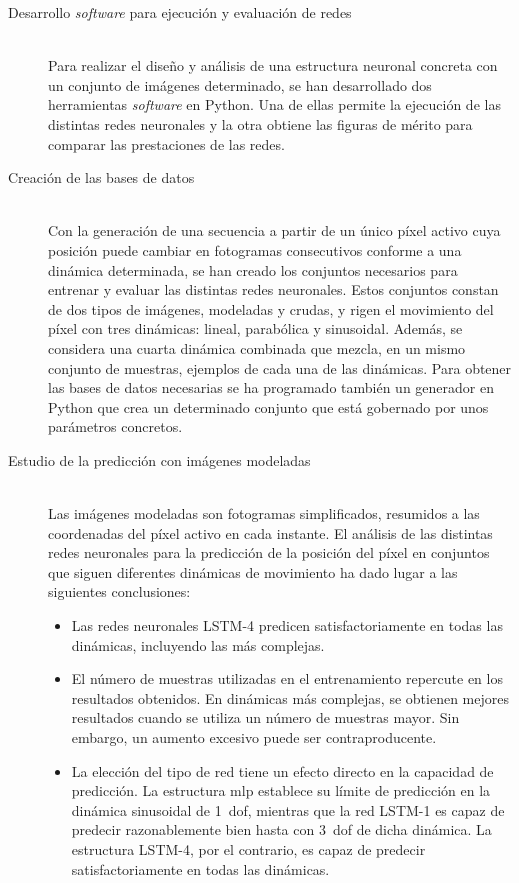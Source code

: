 \begin{description}
	\item[Desarrollo \textit{software} para ejecución y evaluación de redes] 
	\hfill 
	\vspace{5pt}
	\\
	Para realizar  el  diseño y análisis de una estructura neuronal concreta con un conjunto de imágenes determinado, se han desarrollado dos herramientas \textit{software} en Python. Una de ellas permite la ejecución de las distintas redes neuronales y la otra obtiene las figuras de mérito para  comparar las prestaciones de las redes.
	\item[Creación de las bases de datos] 
	\hfill 
	\vspace{5pt}
	\\
	Con la generación de una secuencia a partir de un único píxel activo cuya posición puede cambiar en fotogramas consecutivos conforme a una dinámica determinada, se han creado los 
	conjuntos necesarios para entrenar y evaluar las distintas redes neuronales. Estos conjuntos constan de dos tipos de imágenes, modeladas y crudas, y rigen el movimiento del píxel con tres dinámicas: lineal, parabólica y sinusoidal. Además, se considera una cuarta dinámica combinada que mezcla, en un mismo conjunto de muestras, ejemplos de cada una de las dinámicas. Para obtener las bases de datos necesarias se ha programado también un generador en Python que crea un determinado conjunto que está gobernado por unos parámetros concretos.  
	\item[Estudio de la predicción con imágenes modeladas] \hfill 
	\vspace{5pt}
	\\
	Las imágenes modeladas son fotogramas simplificados, resumidos a las coordenadas del píxel activo en cada instante. El análisis de las distintas redes neuronales para la predicción de la posición del píxel en conjuntos que siguen diferentes dinámicas de movimiento ha dado lugar a las siguientes conclusiones:
	\begin{itemize}
	    \item Las redes neuronales LSTM-4 predicen satisfactoriamente en todas las dinámicas, incluyendo las más complejas.
	    \item El número de muestras utilizadas en el entrenamiento repercute en los resultados obtenidos. En dinámicas más complejas, se obtienen mejores resultados  cuando se utiliza un número de muestras mayor. Sin embargo, un aumento excesivo puede ser contraproducente.
	    \item La elección del tipo de red tiene un efecto directo en la capacidad de predicción. La estructura \acrshort{mlp} establece su límite de predicción en la dinámica sinusoidal de 1~\acrshort{dof}, mientras que la red LSTM-1 es capaz de predecir razonablemente bien hasta con  3~\acrshort{dof} de dicha dinámica. La estructura LSTM-4, por el contrario, es capaz de predecir satisfactoriamente en todas las dinámicas.

\end{itemize}
\end{description}
